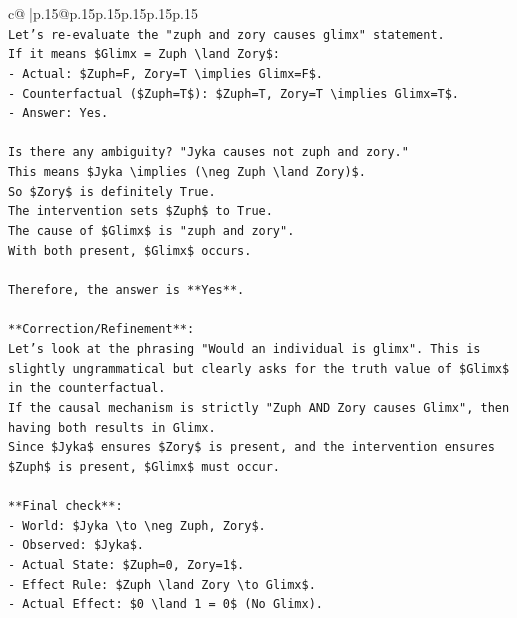 \documentclass{article}
\begin{document}
{\begin{supertabular}{c@{$\;$}|p{.15\linewidth}@{}p{.15\linewidth}p{.15\linewidth}p{.15\linewidth}p{.15\linewidth}p{.15\linewidth}}
{{{\\ 
\texttt{Let's re{-}evaluate the "zuph and zory causes glimx" statement.} \\
\texttt{If it means \$Glimx = Zuph \textbackslash{}land Zory\$:} \\
\texttt{{-} Actual: \$Zuph=F, Zory=T \textbackslash{}implies Glimx=F\$.} \\
\texttt{{-} Counterfactual (\$Zuph=T\$): \$Zuph=T, Zory=T \textbackslash{}implies Glimx=T\$.} \\
\texttt{{-} Answer: Yes.} \\
\\ 
\texttt{Is there any ambiguity? "Jyka causes not zuph and zory."} \\
\texttt{This means \$Jyka \textbackslash{}implies (\textbackslash{}neg Zuph \textbackslash{}land Zory)\$.} \\
\texttt{So \$Zory\$ is definitely True.} \\
\texttt{The intervention sets \$Zuph\$ to True.} \\
\texttt{The cause of \$Glimx\$ is "zuph and zory".} \\
\texttt{With both present, \$Glimx\$ occurs.} \\
\\ 
\texttt{Therefore, the answer is **Yes**.} \\
\\ 
\texttt{**Correction/Refinement**:} \\
\texttt{Let's look at the phrasing "Would an individual is glimx". This is slightly ungrammatical but clearly asks for the truth value of \$Glimx\$ in the counterfactual.} \\
\texttt{If the causal mechanism is strictly "Zuph AND Zory causes Glimx", then having both results in Glimx.} \\
\texttt{Since \$Jyka\$ ensures \$Zory\$ is present, and the intervention ensures \$Zuph\$ is present, \$Glimx\$ must occur.} \\
\\ 
\texttt{**Final check**:} \\
\texttt{{-} World: \$Jyka \textbackslash{}to \textbackslash{}neg Zuph, Zory\$.} \\
\texttt{{-} Observed: \$Jyka\$.} \\
\texttt{{-} Actual State: \$Zuph=0, Zory=1\$.} \\
\texttt{{-} Effect Rule: \$Zuph \textbackslash{}land Zory \textbackslash{}to Glimx\$.} \\
\texttt{{-} Actual Effect: \$0 \textbackslash{}land 1 = 0\$ (No Glimx).} \\
}}}
\end{supertabular}}
\end{document}
